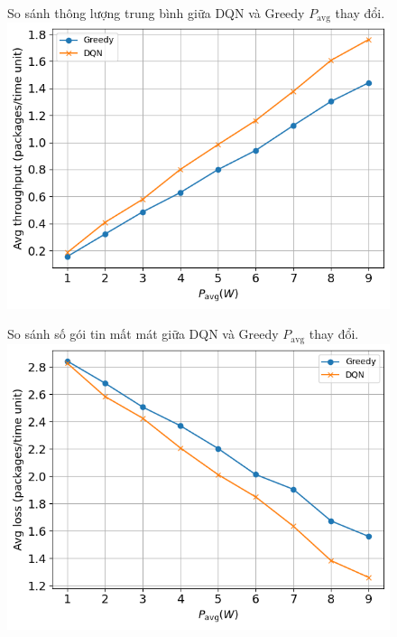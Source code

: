 \documentclass{uetgraduation}
\begin{document}
\begin{figure}{So sánh thông lượng trung bình giữa DQN và Greedy $P_\text{avg}$ thay đổi.}
    \centering
    \includegraphics[scale=0.8]{p_avg_throughput}
    \label{fig:p_avg_throughput}
\end{figure}
\begin{figure}{So sánh số gói tin mất mát giữa DQN và Greedy $P_\text{avg}$ thay đổi.}
    \centering
    \includegraphics[scale=0.8]{p_avg_loss}
    \label{fig:p_avg_loss}
\end{figure}
\end{document}

